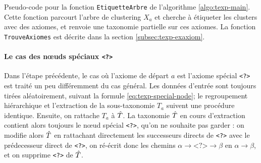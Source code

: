 \begin{algorithm}

\caption{Pseudo-code pour la fonction \texttt{EtiquetteArbre} de l'algorithme \ref{algo:texp-main}. Cette fonction parcourt l'arbre de clustering $X_a$ et cherche à étiqueter les clusters avec des axiomes, et renvoie une taxonomie partielle sur ces axiomes. La fonction \texttt{TrouveAxiomes} est décrite dans la section \ref{subsec:texp-exaxiom}.}
\label{algo:texp-trouve}
\end{algorithm}

\paragraph{Le cas des nœuds spéciaux \texttt{<?>}} 
Dans l'étape précédente, le cas où l'axiome de départ $a$ est l'axiome spécial \texttt{<?>} est traité un peu différemment du cas général. Les données d'entrée sont toujours tirées aléatoirement, suivant la formule \ref{eq:texp-special-node}; le regroupement hiérarchique et l'extraction de la sous-taxonomie $T_a$ suivent une procédure identique. Ensuite, on rattache $T_a$ à $\hat{T}$. La taxonomie $\hat{T}$ en cours d'extraction contient alors toujours le nœud spécial \texttt{<?>}, qu'on ne souhaite pas garder : on modifie alors $\hat{T}$ en rattachant directement les successeurs directs de \texttt{<?>} avec le prédecesseur direct de \texttt{<?>}, on ré-écrit donc les chemins $\alpha \rightarrow \texttt{<?>} \rightarrow \beta$ en $\alpha \rightarrow \beta$, et on supprime \texttt{<?>} de $\hat{T}$.

